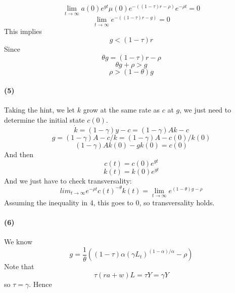 \documentclass[10pt,letter]{article}
\newcommand{\problempart}[1]{\paragraph{#1}}
\begin{document}
\[ \lim_{t\to\infty} a(0) e^{gt} \mu(0)e^{-((1-\tau)r-\rho)} e^{-\rho t} = 0 \]
\[ \lim_{t\to\infty} e^{-((1-\tau)r - g)}  = 0 \]
This implies
\[ g < (1-\tau)r \]
Since
\[ \theta g = (1-\tau)r - \rho \]
\[ \theta g + \rho > g \]
\[ \rho > (1-\theta)g \]
\problempart{(5)}
Taking the hint, we let $k$ grow at the same rate as $c$ at $g$, we just need to determine the initial state $c(0)$.
\[ \dot{k} = (1-\gamma)y - c = (1-\gamma)Ak - c \]
\[ g = (1-\gamma)A - c/k = (1-\gamma)A - c(0)/k(0) \]
\[ (1-\gamma)Ak(0) - gk(0) = c(0) \]
And then
\[ c(t) = c(0) e^{gt} \]
\[ k(t) = k(0) e^{gt} \]
And we just have to check transversality:
\[ lim_{t\to\infty}e^{-\rho t} c(t)^{-\theta} k(t) = \lim_{t\to\infty}e^{(1-\theta) g - \rho} \]
Assuming the inequality in 4, this goes to 0, so transversality holds.
\problempart{(6)}
We know
\[g  = \frac{1}{\theta}\left((1-\tau)\alpha (\gamma L_t)^{(1-\alpha)/\alpha} - \rho \right) \]
Note that
\[ \tau (r a + w)L = \tau Y  = \gamma Y \]
so $\tau = \gamma$. Hence
\end{document}
